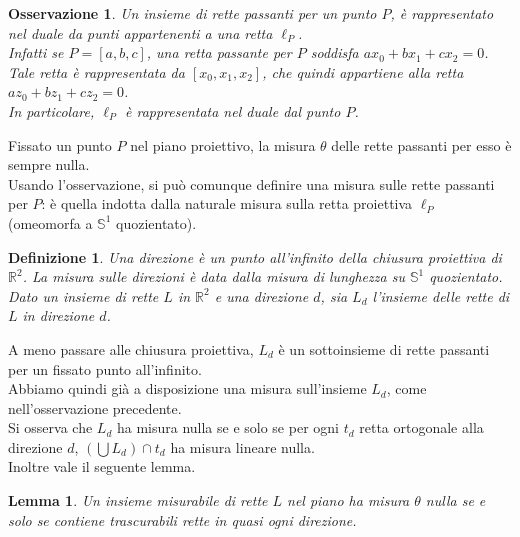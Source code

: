 \documentclass[a4paper, twoside,openright]{article}
\newcommand{\R}{\mathbb{R}}
\renewcommand{\S}{\mathbb{S}}
\newcommand{\<}{\langle}
\renewcommand{\>}{\rangle}
\newtheorem{lemma}[teo]{Lemma}
\newtheorem{defin}[teo]{Definizione}
\newtheorem{oss}[teo]{Osservazione}
\begin{document}
\begin{oss}
	Un insieme di rette passanti per un punto $P$, è rappresentato nel duale da punti appartenenti a una retta $\ell_P$.\\
	Infatti se $P=[a,b,c]$, una retta passante per $P$ soddisfa $ax_0+bx_1+cx_2=0$. Tale retta è rappresentata da $[x_0,x_1,x_2]$, che quindi appartiene alla retta $az_0+bz_1+cz_2=0$.\\
	In particolare, $\ell_P$ è rappresentata nel duale dal punto $P$.
\end{oss}

Fissato un punto $P$ nel piano proiettivo, la misura $\theta$ delle rette passanti per esso è sempre nulla.\\
Usando l'osservazione, si può comunque definire una misura sulle rette passanti per $P$: è quella indotta dalla naturale misura sulla retta proiettiva $\ell_P$ (omeomorfa a $\S^1$ quozientato).

\begin{defin}
Una direzione è un punto all'infinito della chiusura proiettiva di $\R^2$. La misura sulle direzioni è data dalla misura di lunghezza su $\S^1$ quozientato.\\
Dato un insieme di rette $L$ in $\R^2$ e una direzione $d$, sia $L_{d}$ l'insieme delle rette di $L$ in direzione $d$.
\end{defin}

A meno passare alle chiusura proiettiva, $L_{d}$ è un sottoinsieme di rette passanti per un fissato punto all'infinito.\\
Abbiamo quindi già a disposizione una misura sull'insieme $L_d$, come nell'osservazione precedente.\\
Si osserva che $L_d$ ha misura nulla se e solo se per ogni $t_d$ retta ortogonale alla direzione $d$, $ (\bigcup L_d) \cap t_d$ ha misura lineare nulla.\\
Inoltre vale il seguente lemma.

\begin{lemma}
	Un insieme misurabile di rette $L$ nel piano ha misura $\theta$ nulla se e solo se contiene trascurabili rette in quasi ogni direzione. 
\end{lemma}
\end{document}
